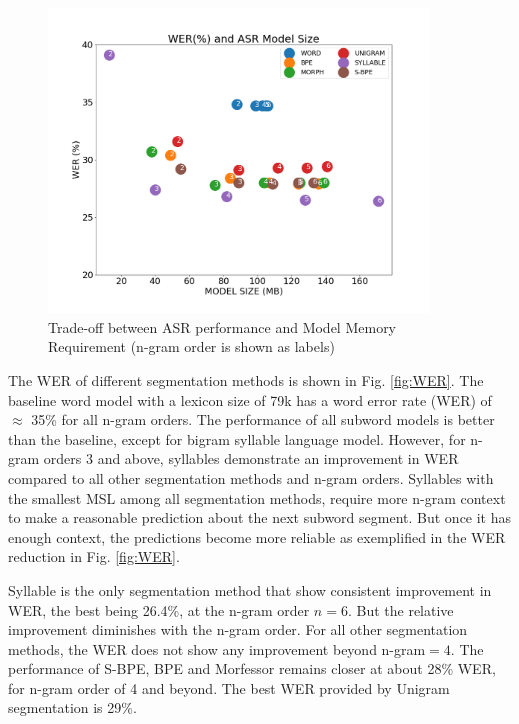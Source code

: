 \begin{figure}[ht]
    \centering
    \includegraphics[width=0.9\textwidth]{Size-WER.png}
    \caption{Trade-off between ASR performance and Model Memory Requirement (n-gram order is shown as labels)}
    \label{fig:Size-WER}
\end{figure}

The WER of different segmentation methods is shown in Fig. \ref{fig:WER}. The
baseline word model with a lexicon size of 79k has a word error rate (WER) of
$\approx$ 35\% for all n-gram orders. The performance of all subword models is
better than the baseline, except for bigram syllable language model. However,
for n-gram orders 3 and above, syllables demonstrate an improvement in WER
compared to all other segmentation methods and n-gram orders. Syllables with the
smallest MSL among all segmentation methods, require more n-gram context to make
a reasonable prediction about the next subword segment. But once it has enough
context, the predictions become more reliable as exemplified in the WER
reduction in Fig. \ref{fig:WER}.

Syllable is the only segmentation method that show consistent improvement in
WER, the best being 26.4\%, at the n-gram order $n=6$. But the relative
improvement diminishes with the n-gram order. For all other segmentation
methods, the WER does not show any improvement beyond n-gram$=4$. The performance
of S-BPE, BPE and Morfessor remains closer at about 28\% WER, for n-gram order
of 4 and beyond. The best WER provided by Unigram segmentation is 29\%.


